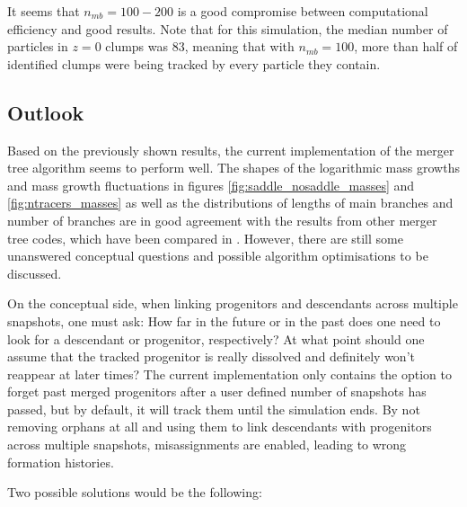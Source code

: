 
It seems that $n_{mb} = 100-200$ is a good compromise between computational efficiency and good results.
Note that for this simulation, the median number of particles in $z=0$ clumps was 83, meaning that with $n_{mb} = 100$, more than half of identified clumps were being tracked by every particle they contain.













\subsection{Outlook}

Based on the previously shown results, the current implementation of the merger tree algorithm seems to perform well.
The shapes of the logarithmic mass growths and mass growth fluctuations in figures \ref{fig:saddle_nosaddle_masses} and  \ref{fig:ntracers_masses} as well as the distributions of lengths of main branches and number of branches are in good agreement with the results from other merger tree codes, which have been compared in \cite{SUSSING_HALOFINDER}. 
However, there are still some unanswered conceptual questions and possible algorithm optimisations to be discussed.

On the conceptual side, when linking progenitors and descendants across multiple snapshots, one must ask:
How far in the future or in the past does one need to look for a descendant or progenitor, respectively?
At what point should one assume that the tracked progenitor is really dissolved and definitely won't reappear at later times?
The current implementation only contains the option to forget past merged progenitors after a user defined number of snapshots has passed, but by default, it will track them until the simulation ends.
By not removing orphans at all and using them to link descendants with progenitors across multiple snapshots, misassignments are enabled, leading to wrong formation histories.

Two possible solutions would be the following:

